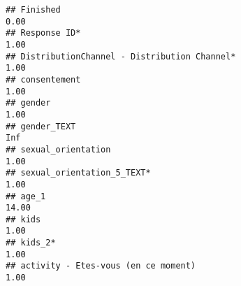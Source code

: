 \documentclass[
]{article}
\begin{document}
\begin{verbatim}
## Finished                                                                                                                                                                                                                    0.00
## Response ID*                                                                                                                                                                                                                1.00
## DistributionChannel - Distribution Channel*                                                                                                                                                                                 1.00
## consentement                                                                                                                                                                                                                1.00
## gender                                                                                                                                                                                                                      1.00
## gender_TEXT                                                                                                                                                                                                                  Inf
## sexual_orientation                                                                                                                                                                                                          1.00
## sexual_orientation_5_TEXT*                                                                                                                                                                                                  1.00
## age_1                                                                                                                                                                                                                      14.00
## kids                                                                                                                                                                                                                        1.00
## kids_2*                                                                                                                                                                                                                     1.00
## activity - Etes-vous (en ce moment)                                                                                                                                                                                         1.00

\end{verbatim}
\end{document}
